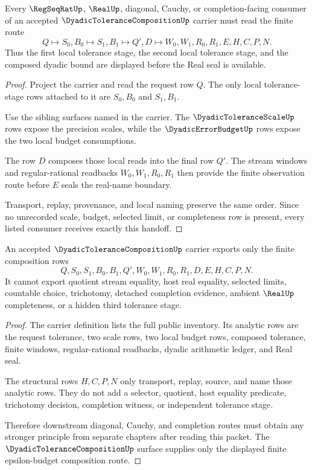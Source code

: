 \begin{theorem}
\label{thm:dyadic-tolerance-composition-scale-budget-handoff}
Every $\RegSeqRatUp$, $\RealUp$, diagonal, Cauchy, or completion-facing consumer of an accepted $\DyadicToleranceCompositionUp$ carrier must read the finite route
$$
Q \longmapsto S_0,B_0 \longmapsto S_1,B_1 \longmapsto Q',D \longmapsto W_0,W_1,R_0,R_1,E,H,C,P,N .
$$
Thus the first local tolerance stage, the second local tolerance stage, and the composed dyadic bound are displayed before the Real seal is available.
\end{theorem}
\begin{proof}
Project the carrier and read the request row $Q$. The only local tolerance-stage rows attached to it are $S_0,B_0$ and $S_1,B_1$.

Use the sibling surfaces named in the carrier. The $\DyadicToleranceScaleUp$ rows expose the precision scales, while the $\DyadicErrorBudgetUp$ rows expose the two local budget consumptions.

The row $D$ composes those local reads into the final row $Q'$. The stream windows and regular-rational readbacks $W_0,W_1,R_0,R_1$ then provide the finite observation route before $E$ seals the real-name boundary.

Transport, replay, provenance, and local naming preserve the same order. Since no unrecorded scale, budget, selected limit, or completeness row is present, every listed consumer receives exactly this handoff.
\end{proof}

\begin{theorem}
\label{thm:dyadic-tolerance-composition-nonescape}
An accepted $\DyadicToleranceCompositionUp$ carrier exports only the finite composition rows
$$
Q,S_0,S_1,B_0,B_1,Q',W_0,W_1,R_0,R_1,D,E,H,C,P,N .
$$
It cannot export quotient stream equality, host real equality, selected limits, countable choice, trichotomy, detached completion evidence, ambient $\RealUp$ completeness, or a hidden third tolerance stage.
\end{theorem}
\begin{proof}
The carrier definition lists the full public inventory. Its analytic rows are the request tolerance, two scale rows, two local budget rows, composed tolerance, finite windows, regular-rational readbacks, dyadic arithmetic ledger, and Real seal.

The structural rows $H,C,P,N$ only transport, replay, source, and name those analytic rows. They do not add a selector, quotient, host equality predicate, trichotomy decision, completion witness, or independent tolerance stage.

Therefore downstream diagonal, Cauchy, and completion routes must obtain any stronger principle from separate chapters after reading this packet. The $\DyadicToleranceCompositionUp$ surface supplies only the displayed finite epsilon-budget composition route.
\end{proof}

